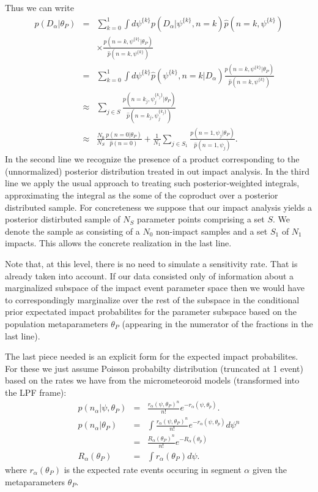 \documentclass[twocolumn,showpacs,aps,prd,nobibnotes,nofootinbib,floatfix]{revtex4-1}
\begin{document}
Thus we can write
\begin{eqnarray}
  p(D_\alpha|\theta_P)&=&\sum_{k=0}^1\int d\psi^{\{k\}} p(D_\alpha|\psi^{\{k\}},n=k)\hat p(n=k,\psi^{\{k\}})\nonumber\\
  &&\times\frac{p(n=k,\psi^{\{k\}}|\theta_P)}{\hat p(n=k,\psi^{\{k\}})}\\
  &=&\sum_{k=0}^1\int d\psi^{\{k\}} \hat p(\psi^{\{k\}},n=k|D_\alpha)\frac{p(n=k,\psi^{\{k\}}|\theta_P)}{\hat p(n=k,\psi^{\{k\}})}\\
  &\approx&\sum_{j\in S}\frac{p(n=k_j,\psi_j^{\{k_j\}}|\theta_P)}{\hat p(n=k_j,\psi_j^{\{k_j\}})}\\
  &\approx&\frac{N_0}{N_S}\frac{p(n=0|\theta_P)}{\hat p(n=0)}+\frac1{N_1}\sum_{j\in S_1}\frac{p(n=1,\psi_j|\theta_P)}{\hat p(n=1,\psi_j)}.
\end{eqnarray}
In the second line we recognize the presence of a product corresponding to the (unnormalized) posterior distribution treated in out impact analysis.  In the third line we apply the usual approach to treating such posterior-weighted integrals, approximating the integral as the some of the coproduct over a posterior distributed sample.  For concreteness we suppose that our impact analysis yields a posterior distirbuted sample of $N_S$ parameter points comprising a set $S$.  We denote the sample as consisting of a $N_0$ non-impact samples and a set $S_1$ of $N_1$ impacts. This allows the concrete realization in the last line.

Note that, at this level, there is no need to simulate a sensitivity rate.  That is already taken into account.  If our data consisted only of information about a marginalized subspace of the impact event parameter space then we would have to correspondingly marginalize over the rest of the subspace in the conditional prior expectated impact probabilites for the parameter subspace based on the population metaparameters $\theta_P$ (appearing in the numerator of the fractions in the last line).

The last piece needed is an explicit form for the expected impact probabilites.  For these we just assume Poisson probabilty distribution (truncated at 1 event) based on the rates we have from the micrometeoroid models (transformed into the LPF frame):
\begin{eqnarray*}
  p(n_\alpha|\psi,\theta_P)&=&\frac{r_\alpha(\psi,\theta_P)^n}{n!}e^{-r_\alpha(\psi,\theta_p)}.\\
  p(n_\alpha|\theta_P)&=&\int\frac{r_\alpha(\psi,\theta_P)^n}{n!}e^{-r_\alpha(\psi,\theta_p)}d\psi^n\\
  &=&\frac{R_\alpha(\theta_P)^n}{n!}e^{-R_\alpha(\theta_p)}\\
  R_\alpha(\theta_P)&=&\int{r_\alpha(\theta_P)}d\psi.
\end{eqnarray*}
where $r_\alpha(\theta_P)$ is the expected rate events occuring in segment $\alpha$ given the metaparameters $\theta_P$.  
\end{document}
